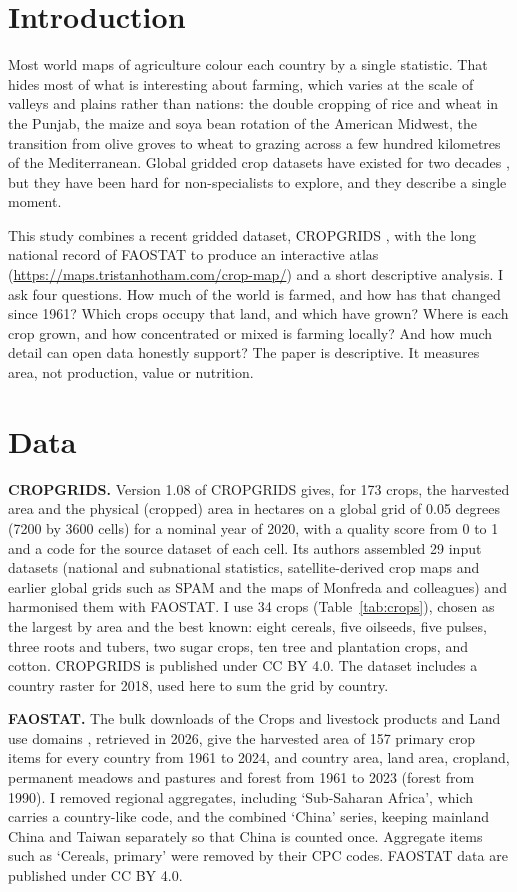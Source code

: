 \documentclass[11pt,a4paper]{article}
\begin{document}
\section{Introduction}
Most world maps of agriculture colour each country by a single statistic. That hides most of what is interesting about farming, which varies at the scale of valleys and plains rather than nations: the double cropping of rice and wheat in the Punjab, the maize and soya bean rotation of the American Midwest, the transition from olive groves to wheat to grazing across a few hundred kilometres of the Mediterranean. Global gridded crop datasets have existed for two decades \citep{monfreda,spam}, but they have been hard for non-specialists to explore, and they describe a single moment.

This study combines a recent gridded dataset, CROPGRIDS \citep{cropgrids}, with the long national record of FAOSTAT \citep{faostat} to produce an interactive atlas (\url{https://maps.tristanhotham.com/crop-map/}) and a short descriptive analysis. I ask four questions. How much of the world is farmed, and how has that changed since 1961? Which crops occupy that land, and which have grown? Where is each crop grown, and how concentrated or mixed is farming locally? And how much detail can open data honestly support? The paper is descriptive. It measures area, not production, value or nutrition.

\section{Data}
\textbf{CROPGRIDS.} Version 1.08 of CROPGRIDS \citep{cropgrids} gives, for 173 crops, the harvested area and the physical (cropped) area in hectares on a global grid of 0.05 degrees (7200 by 3600 cells) for a nominal year of 2020, with a quality score from 0 to 1 and a code for the source dataset of each cell. Its authors assembled 29 input datasets (national and subnational statistics, satellite-derived crop maps and earlier global grids such as SPAM and the maps of Monfreda and colleagues) and harmonised them with FAOSTAT. I use 34 crops (Table~\ref{tab:crops}), chosen as the largest by area and the best known: eight cereals, five oilseeds, five pulses, three roots and tubers, two sugar crops, ten tree and plantation crops, and cotton. CROPGRIDS is published under CC BY 4.0. The dataset includes a country raster for 2018, used here to sum the grid by country.

\textbf{FAOSTAT.} The bulk downloads of the Crops and livestock products and Land use domains \citep{faostat}, retrieved in 2026, give the harvested area of 157 primary crop items for every country from 1961 to 2024, and country area, land area, cropland, permanent meadows and pastures and forest from 1961 to 2023 (forest from 1990). I removed regional aggregates, including `Sub-Saharan Africa', which carries a country-like code, and the combined `China' series, keeping mainland China and Taiwan separately so that China is counted once. Aggregate items such as `Cereals, primary' were removed by their CPC codes. FAOSTAT data are published under CC BY 4.0.
\end{document}
